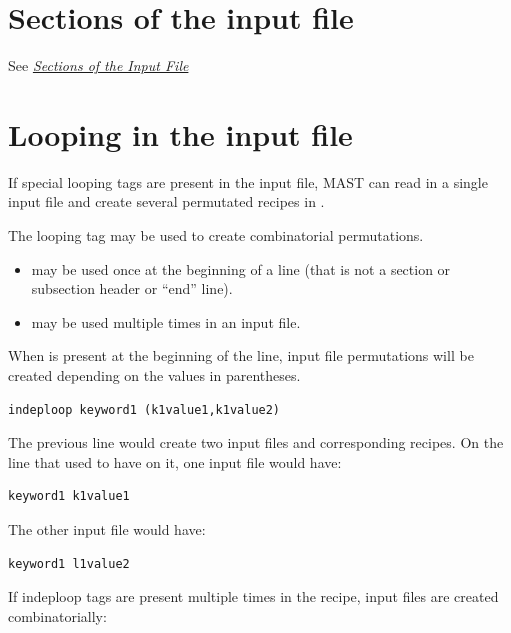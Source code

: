 \documentclass[letterpaper,10pt,english]{sphinxmanual}
\begin{document}
\section{Sections of the input file}
\label{3_0_inputfile:sections-of-the-input-file}
See {\hyperref[3_1_inputsections::doc]{\emph{Sections of the Input File}}}


\section{Looping in the input file}
\label{3_0_inputfile:looping-in-the-input-file}
If special looping tags are present in the input file, MAST can read in a single input file and create several permutated recipes in .

The looping tag  may be used to create combinatorial permutations.
\begin{itemize}
\item {} 
 may be used once at the beginning of a line (that is not a section or subsection header or ``end'' line).

\item {} 
 may be used multiple times in an input file.

\end{itemize}

When  is present at the beginning of the line, input file permutations will be created depending on the values in parentheses.

\begin{Verbatim}[commandchars=\\\{\}]
indeploop keyword1 (k1value1,k1value2)
\end{Verbatim}

The previous line would create two input files and corresponding recipes.
On the line that used to have  on it, one input file would have:

\begin{Verbatim}[commandchars=\\\{\}]
keyword1 k1value1
\end{Verbatim}

The other input file would have:

\begin{Verbatim}[commandchars=\\\{\}]
keyword1 l1value2
\end{Verbatim}

If indeploop tags are present multiple times in the recipe, input files are created combinatorially:
\end{document}
